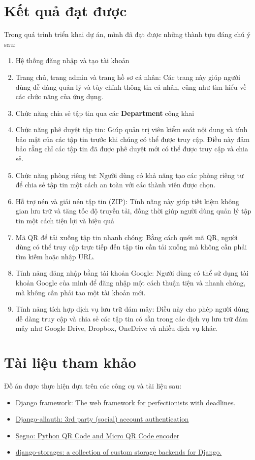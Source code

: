 \documentclass[paper=a4wide, fontsize=12pt]{scrartcl}	 %
\begin{document}
\section{Kết quả đạt được}

Trong quá trình triển khai dự án, mình đã đạt được những thành tựu đáng chú ý sau:
\begin{enumerate}
    \item Hệ thống đăng nhập và tạo tài khoản
    \item Trang chủ, trang admin và trang hồ sơ cá nhân: Các trang này giúp người dùng dễ dàng quản lý và tùy chỉnh thông tin cá nhân, cũng như tìm hiểu về các chức năng của ứng dụng.
    \item Chức năng chia sẻ tập tin qua các \textbf{Department} công khai
    \item Chức năng phê duyệt tập tin: Giúp quản trị viên kiểm soát nội dung và tính bảo mật của các tập tin trước khi chúng có thể được truy cập. Điều này đảm bảo rằng chỉ các tập tin đã được phê duyệt mới có thể được truy cập và chia sẻ.
    \item Chức năng phòng riêng tư: Người dùng có khả năng tạo các phòng riêng tư để chia sẻ tập tin một cách an toàn với các thành viên được chọn.
    \item Hỗ trợ nén và giải nén tập tin (ZIP): Tính năng này giúp tiết kiệm không gian lưu trữ và tăng tốc độ truyền tải, đồng thời giúp người dùng quản lý tập tin một cách tiện lợi và hiệu quả
    \item Mã QR để tải xuống tập tin nhanh chóng: Bằng cách quét mã QR, người dùng có thể truy cập trực tiếp đến tập tin cần tải xuống mà không cần phải tìm kiếm hoặc nhập URL.
    \item Tính năng đăng nhập bằng tài khoản Google: Người dùng có thể sử dụng tài khoản Google của mình để đăng nhập một cách thuận tiện và nhanh chóng, mà không cần phải tạo một tài khoản mới.
    \item Tính năng tích hợp dịch vụ lưu trữ đám mây: Điều này cho phép người dùng dễ dàng truy cập và chia sẻ các tập tin có sẵn trong các dịch vụ lưu trữ đám mây như Google Drive, Dropbox, OneDrive và nhiều dịch vụ khác.
\end{enumerate}
\section{Tài liệu tham khảo}

Đồ án được thực hiện dựa trên các công cụ và tài liệu sau:
\begin{itemize}
    \item \href{https://docs.djangoproject.com/en/4.2/}{Django framework: The web framework for perfectionists with deadlines.} 
    \item \href{https://django-allauth.readthedocs.io/en/latest/}{Django-allauth: 3rd party (social) account authentication}
    \item \href{https://segno.readthedocs.io/en/latest/}{Segno: Python QR Code and Micro QR Code encoder}
    \item \href{https://django-storages.readthedocs.io/en/latest/}{django-storages: a collection of custom storage backends for Django.}
\end{itemize}
\end{document}
